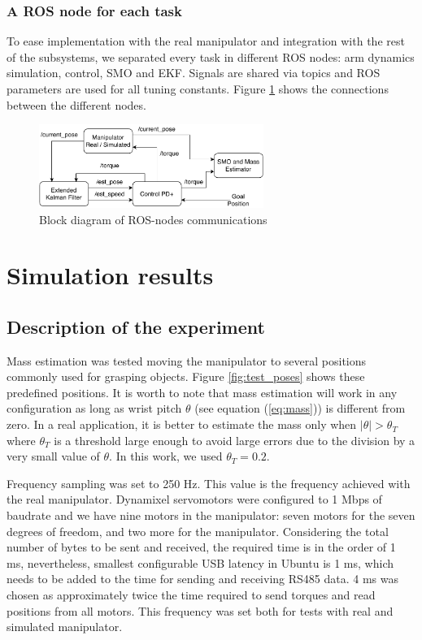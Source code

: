 \documentclass[a4paper, 10pt]{article}
\begin{document}
\subsubsection*{A ROS node for each task}
To ease implementation with the real manipulator and integration with the rest of the subsystems, we separated every task in different ROS nodes: arm dynamics simulation, control, SMO and EKF. Signals are shared via topics and ROS parameters are used for all tuning constants. Figure \ref{fig:RosNodes} shows the connections between the different nodes. 
\begin{figure}
  \centering
  \includegraphics[width=0.65\textwidth]{Figures/RosNodes.pdf}
  \caption{Block diagram of ROS-nodes communications}
  \label{fig:RosNodes}
\end{figure}


\section{Simulation results}
\label{sec:results}
\subsection{Description of the experiment}
Mass estimation was tested moving the manipulator to several positions commonly used for grasping objects. Figure \ref{fig:test_poses} shows these predefined positions. It is worth to note that mass estimation will work in any configuration as long as wrist pitch $\theta$ (see equation (\ref{eq:mass})) is different from zero. In a real application, it is better to estimate the mass only when $\vert\theta\vert > \theta_T$ where $\theta_T$ is a threshold large enough to avoid large errors due to the division by a very small value of $\theta$. In this work, we used $\theta_T=0.2$. 

Frequency sampling was set to 250 Hz. This value is the frequency achieved with the real manipulator. Dynamixel servomotors were configured to 1 Mbps of baudrate and we have nine motors in the manipulator: seven motors for the seven degrees of freedom, and two more for the manipulator. Considering the total number of bytes to be sent and received, the required time is in the order of 1 ms, nevertheless, smallest configurable USB latency in Ubuntu is 1 ms, which needs to be added to the time for sending and receiving RS485 data. 4 ms was chosen as approximately twice the time required to send torques and read positions from all motors. This frequency was set both for tests with real and simulated manipulator. 
\end{document}
